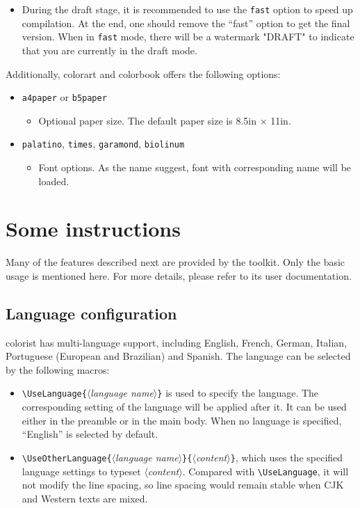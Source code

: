 \documentclass[allowbf,puretext]{colorart}
\theoremstyle{basic}
\theoremstyle{emphasis}
\theoremstyle{simple}
\providecommand{\meta}[1]{$\langle${\normalfont\itshape#1}$\rangle$}
\newenvironment{tip}[1][Tip]{%
    \begin{tcolorbox}[breakable,
        enhanced,
        width = \textwidth,
        colback = paper, colbacktitle = paper,
        colframe = gray!50, boxrule=0.2mm,
        coltitle = black,
        fonttitle = \sffamily,
        attach boxed title to top left = {yshift=-\tcboxedtitleheight/2, xshift=.5cm},
        boxed title style = {boxrule=0pt, colframe=paper},
        before skip = 0.3cm,
        after skip = 0.3cm,
        top = 3mm,
        bottom = 3mm,
        title={\scshape\sffamily #1}]%
}{\end{tcolorbox}}
\providecommand{\colorist}{{\normalfont\textsf{colorist}}}
\providecommand{\colorart}{{\normalfont\textsf{colorart}}}
\providecommand{\colorbook}{{\normalfont\textsf{colorbook}}}
\begin{document}
\begin{tip}
    \begin{itemize}
        \item During the draft stage, it is recommended to use the \verb|fast| option to speed up compilation. At the end, one should remove the ``fast'' option to get the final version. When in \verb|fast| mode, there will be a watermark "DRAFT" to indicate that you are currently in the draft mode.
    \end{itemize}
\end{tip}

\bigskip
Additionally, \colorart{} and \colorbook{} offers the following options: 
\begin{itemize}
    \item \texttt{a4paper} or \texttt{b5paper}
        \begin{itemize}
            \item Optional paper size. The default paper size is 8.5in $\times$ 11in.
        \end{itemize}
        \item \texttt{palatino}, \texttt{times}, \texttt{garamond}, \texttt{biolinum}
            \begin{itemize}
                \item Font options. As the name suggest, font with corresponding name will be loaded.
            \end{itemize}
\end{itemize}


\section{Some instructions}

Many of the features described next are provided by the \ProjLib{} toolkit. Only the basic usage is mentioned here. For more details, please refer to its user documentation.

\subsection{Language configuration}

\colorist{} has multi-language support, including English, French, German, Italian, Portuguese (European and Brazilian) and Spanish. The language can be selected by the following macros:

\begin{itemize}
    \item \lstinline|\UseLanguage{|\meta{language name}\lstinline|}| is used to specify the language. The corresponding setting of the language will be applied after it. It can be used either in the preamble or in the main body. When no language is specified, ``English'' is selected by default.
    \item \lstinline|\UseOtherLanguage{|\meta{language name}\lstinline|}{|\meta{content}\lstinline|}|, which uses the specified language settings to typeset \meta{content}. Compared with \lstinline|\UseLanguage|, it will not modify the line spacing, so line spacing would remain stable when CJK and Western texts are mixed.
\end{itemize}
\end{document}
